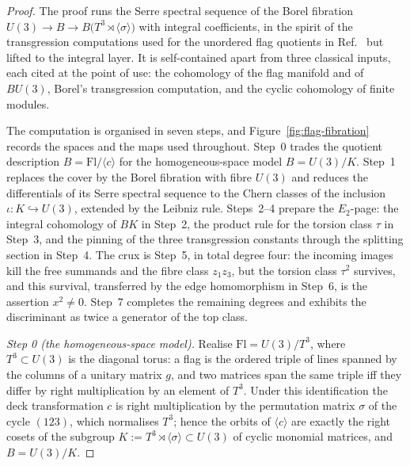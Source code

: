 \documentclass[11pt,a4paper]{article}
\begin{document}
\begin{proof}
The proof runs the Serre spectral sequence of the Borel fibration
$U(3)\to B\to B\bigl(T^3\rtimes\langle\sigma\rangle\bigr)$ with integral
coefficients, in the spirit of the transgression computations used for the
unordered flag quotients in Ref.~\cite{GuerraJana2025} but lifted to the
integral layer. It is self-contained apart from three classical inputs,
each cited at the point of use: the cohomology of the flag manifold and of
$BU(3)$, Borel's transgression computation, and the cyclic cohomology of
finite modules.

The computation is organised in seven steps, and Figure~\ref{fig:flag-fibration} records the spaces and the maps used throughout. Step~0 trades the quotient description $B=\mathrm{Fl}/\langle c\rangle$ for the homogeneous-space model $B=U(3)/K$. Step~1 replaces the cover by the Borel fibration with fibre $U(3)$ and reduces the differentials of its Serre spectral sequence to the Chern classes of the inclusion $\iota\colon K\hookrightarrow U(3)$, extended by the Leibniz rule. Steps~2--4 prepare the $E_2$-page: the integral cohomology of $BK$ in Step~2, the product rule for the torsion class $\tau$ in Step~3, and the pinning of the three transgression constants through the splitting section in Step~4. The crux is Step~5, in total degree four: the incoming images kill the free summands and the fibre class $z_1z_3$, but the torsion class $\tau^2$ survives, and this survival, transferred by the edge homomorphism in Step~6, is the assertion $x^2\ne0$. Step~7 completes the remaining degrees and exhibits the discriminant as twice a generator of the top class.

\emph{Step 0 (the homogeneous-space model).} Realise
$\mathrm{Fl}=U(3)/T^3$, where $T^3\subset U(3)$ is the diagonal torus: a
flag is the ordered triple of lines spanned by the columns of a unitary
matrix $g$, and two matrices span the same triple iff they differ by right
multiplication by an element of $T^3$. Under this identification the deck
transformation $c$ is right multiplication by the permutation matrix
$\sigma$ of the cycle $(123)$, which normalises $T^3$; hence the orbits of
$\langle c\rangle$ are exactly the right cosets of the subgroup
$K:=T^3\rtimes\langle\sigma\rangle\subset U(3)$ of cyclic monomial
matrices, and $B=U(3)/K$.


\end{proof}
\end{document}
